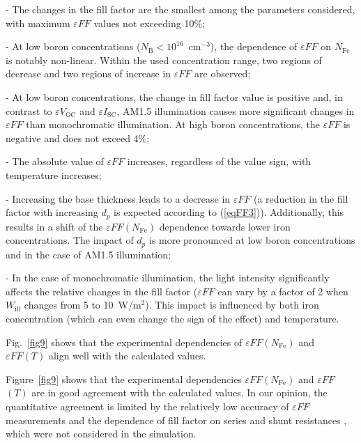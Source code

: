 \documentclass[a4paper,fleqn]{cas-sc}
\begin{document}
\noindent
- The changes in the fill factor are the smallest among the parameters considered,
with maximum $\varepsilon F\!F$ values not exceeding 10\%;

\noindent
- At low boron concentrations ($N_\mathrm{B}<10^{16}$~cm$^{-3}$),
the dependence of $\varepsilon F\!F$ on $N_\mathrm{Fe}$ is notably non-linear.
Within the used concentration range, two regions of decrease and two regions of increase in $\varepsilon F\!F$ are observed;

\noindent
- At low boron concentrations, the change in fill factor value is positive and,
in contrast to $\varepsilon V_\mathrm{OC}$ and $\varepsilon I_\mathrm{SC}$,
AM1.5 illumination causes more significant changes in $\varepsilon F\!F$ than monochromatic illumination.
At high boron concentrations, the $\varepsilon F\!F$ is negative and does not exceed 4\%;


\noindent
- The absolute value of $\varepsilon F\!F$ increases, regardless of the value sign, with temperature increases;


\noindent
- Increasing the base thickness leads to a decrease in $\varepsilon F\!F$ (a reduction in the fill factor with increasing $d_p$ is expected according to (\ref{eqFF3})). Additionally, this results in a shift of the $\varepsilon F\!F\left(N_\mathrm{Fe}\right)$ dependence towards lower iron concentrations.
The impact of $d_p$ is more pronounced at low boron concentrations and in the case of AM1.5 illumination;


\noindent
- In the case of monochromatic illumination, the light intensity significantly affects the relative changes in the fill factor
($\varepsilon F\!F$ can vary by a factor of 2 when $W_\mathrm{ill}$ changes from 5 to 10~W/m$^{2}$).
This impact is influenced by both iron concentration (which can even change the sign of the effect) and temperature.

Fig.~\ref{fig9} shows that the experimental dependencies of  $\varepsilon F\!F\left(N_\mathrm{Fe}\right)$
and $\varepsilon F\!F\left(T\right)$ align well with the calculated values.

Figure~\ref{fig9} shows that the experimental dependencies $\varepsilon F\!F$$\left(N_\mathrm{Fe}\right)$ and $\varepsilon F\!F$$\left(T\right)$ are in good agreement with the calculated values.
In our opinion, the quantitative agreement is limited by the relatively low accuracy of $\varepsilon F\!F$ measurements
and the dependence of fill factor on series and shunt resistances \cite{Green1981,Green1982},
which were not considered in the simulation.
\end{document}
